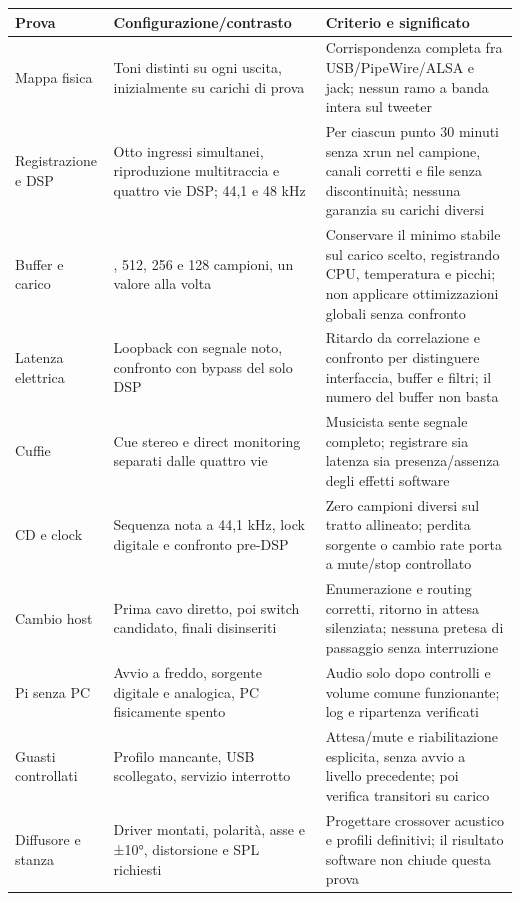 \documentclass[
  italian,
  11pt,
  a4paper,
]{article}
\newcounter{none} %
\begin{document}
{\def\LTcaptype{none} %
\begin{longtable}[]{@{}
  >{\raggedright\arraybackslash}p{}
  >{\raggedright\arraybackslash}p{}
  >{\raggedright\arraybackslash}p{}@{}}
\toprule\noalign{}
\begin{minipage}[b]{\linewidth}\raggedright
Prova
\end{minipage} & \begin{minipage}[b]{\linewidth}\raggedright
Configurazione/contrasto
\end{minipage} & \begin{minipage}[b]{\linewidth}\raggedright
Criterio e significato
\end{minipage} \\
\midrule\noalign{}
\endhead
\bottomrule\noalign{}
\endlastfoot
Mappa fisica & Toni distinti su ogni uscita, inizialmente su carichi di prova &
Corrispondenza completa fra USB/PipeWire/ALSA e jack; nessun ramo a banda intera sul
tweeter \\
Registrazione e DSP & Otto ingressi simultanei, riproduzione multitraccia e quattro vie DSP;
44,1 e 48 kHz & Per ciascun punto 30 minuti senza xrun nel campione, canali corretti e file
senza discontinuità; nessuna garanzia su carichi diversi \\
Buffer e carico & 1024, 512, 256 e 128 campioni, un valore alla volta & Conservare il minimo
stabile sul carico scelto, registrando CPU, temperatura e picchi; non applicare
ottimizzazioni globali senza confronto \\
Latenza elettrica & Loopback con segnale noto, confronto con bypass del solo DSP & Ritardo
da correlazione e confronto per distinguere interfaccia, buffer e filtri; il numero del
buffer non basta \\
Cuffie & Cue stereo e direct monitoring separati dalle quattro vie & Musicista sente segnale
completo; registrare sia latenza sia presenza/assenza degli effetti software \\
CD e clock & Sequenza nota a 44,1 kHz, lock digitale e confronto pre-DSP & Zero campioni
diversi sul tratto allineato; perdita sorgente o cambio rate porta a mute/stop
controllato \\
Cambio host & Prima cavo diretto, poi switch candidato, finali disinseriti & Enumerazione e
routing corretti, ritorno in attesa silenziata; nessuna pretesa di passaggio senza
interruzione \\
Pi senza PC & Avvio a freddo, sorgente digitale e analogica, PC fisicamente spento & Audio
solo dopo controlli e volume comune funzionante; log e ripartenza verificati \\
Guasti controllati & Profilo mancante, USB scollegato, servizio interrotto & Attesa/mute e
riabilitazione esplicita, senza avvio a livello precedente; poi verifica transitori su
carico \\
Diffusore e stanza & Driver montati, polarità, asse e ±10°, distorsione e SPL richiesti &
Progettare crossover acustico e profili definitivi; il risultato software non chiude questa
prova \\
\end{longtable}
}
\end{document}

